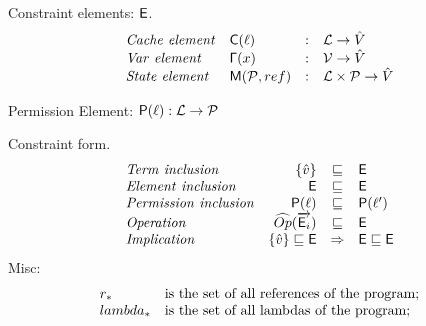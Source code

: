 Constraint elements: $\mathsf{E}$.
\[
\begin{array}{llcl}
\mathit{Cache\ element} & \mathsf{C}(\ell)& : & {\mathcal L} \rightarrow \hat{V} \\
\mathit{Var\ element} & \mathsf{\Gamma}(x) & : & \mathcal{V} \rightarrow \hat{V} \\
\mathit{State\ element} & \mathsf{M}(\mathcal{P}, ref) & : & {\mathcal L} \times \mathcal{P} \rightarrow \hat{V} \\
\end{array}
\]

Permission Element: $\mathsf{P}(\ell) : {\mathcal L} \rightarrow \mathcal{P} $


Constraint form.
\[
\begin{array}{lrcl}
\mathit{Term\ inclusion} & \{\hat{v}\} & \sqsubseteq & \mathsf{E} \\
\mathit{Element\ inclusion} & \mathsf{E} & \sqsubseteq & \mathsf{E} \\
\mathit{Permission\ inclusion} & \mathsf{P}(\ell) & \sqsubseteq & \mathsf{P}(\ell') \\
\mathit{Operation} & \widehat{Op}(\overrightarrow{\mathsf{E}_i}) & \sqsubseteq & \mathsf{E} \\
\mathit{Implication} & \{\hat{v}\} \sqsubseteq \mathsf{E} & \Rightarrow & \mathsf{E} \sqsubseteq \mathsf{E} \\
\end{array}
\]
Misc:
\[
\begin{array}{l l}
r_* & $is the set of all references of the program;$\\
lambda_* & $is the set of all lambdas of the program;$\\
\end{array}
\]

